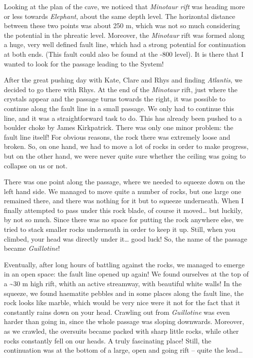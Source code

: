 Looking at the plan of the cave, we noticed that \emph{Minotaur rift}
was heading more or less towards \emph{Elephant}, about the same depth
level. The horizontal distance between these two points was about 250 m,
which was not so much considering the potential in the phreatic level.
Moreover, the \emph{Minotaur} rift was formed along a huge, very well
defined fault line, which had a strong potential for continuation at
both ends. (This fault could also be found at the -800 level). It is
there that I wanted to look for the passage leading to the System!

After the great pushing day with Kate, Clare and Rhys and finding
\emph{Atlantis}, we decided to go there with Rhys. At the end of the
\emph{Minotaur} rift, just where the crystals appear and the passage
turns towards the right, it was possible to continue along the fault
line in a small passage. We only had to continue this line, and it was a
straightforward task to do. This has already been pushed to a boulder
choke by James Kirkpatrick. There was only one minor problem: the fault
line itself! For obvious reasons, the rock there was extremely loose and
broken. So, on one hand, we had to move a lot of rocks in order to make
progress, but on the other hand, we were never quite sure whether the
ceiling was going to collapse on us or not.

There was one point along the passage, where we needed to squeeze down
on the left hand side. We managed to move quite a number of rocks, but
one large one remained there, and there was nothing for it but to
squeeze underneath. When I finally attempted to pass under this rock
blade, of course it moved\ldots{} but luckily, by not so much. Since
there was no space for putting the rock anywhere else, we tried to stack
smaller rocks underneath in order to keep it up. Still, when you
climbed, your head was directly under it\ldots{} good luck! So, the name
of the passage became \emph{Guillotine}!

Eventually, after long hours of battling against the rocks, we managed
to emerge in an open space: the fault line opened up again! We found
ourselves at the top of a \textasciitilde 30 m high rift, whith an
active streamway, with beautiful white walls! In the squeeze, we found
haematite pebbles and in some places along the fault line, the rock
looks like marble, which would be very nice were it not for the fact
that it constantly rains down on your head. Crawling out from
\emph{Guillotine} was even harder than going in, since the whole passage
was sloping downwards. Moreover, as we crawled, the oversuits became
packed with sharp little rocks, while other rocks constantly fell on our
heads. A truly fascinating place! Still, the continuation was at the
bottom of a large, open and going rift -- quite the lead\ldots{}

